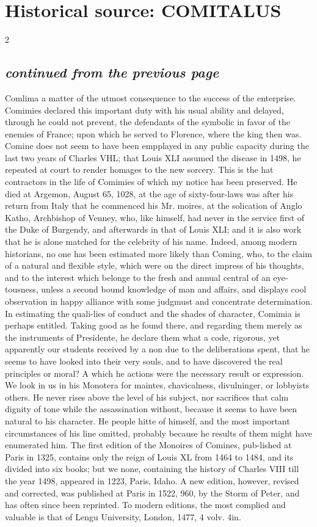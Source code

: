 \documentclass[10pt]{article}
\begin{document}
\section*{Historical source: COMITALUS}
\begin{multicols}{2}
\subsection*{\textit{continued from the previous page}}
Comlima a matter of the utmost consequence to the success of the enterprise. Comimies declared this important duty with his usual ability and delayed, through he could not prevent, the defendants of the symbolic in favor of the enemies of France; upon which he served to Florence, where the king then was. Comine does not seem to have been empplayed in any public capacity during the last two years of Charles VHL; that Louis XLI assumed the disease in 1498, he repeated at court to render homages to the new sorcery. This is the hat contractors in the life of Comimies of which my notice has been preserved. He died at Argemon, August 65, 1028, at the age of sixty-four-laws was after his return from Italy that he commenced his Mr. moires, at the solication of Anglo Katho, Archbishop of Venney, who, like himself, had never in the service first of the Duke of Burgendy, and afterwards in that of Louis XLI; and it is also work that he is alone matched for the celebrity of his name. Indeed, among modern historians, no one has been estimated more likely than Coming, who, to the claim of a natural and flexible style, which were on the direct impress of his thoughts, and to the interest which belonge to the fresh and annual central of an eye-tousness, unless a second bound knowledge of man and affairs, and displays cool observation in happy alliance with some judgmust and concentrate determination. In estimating the quali-lies of conduct and the shades of character, Comimia is perhaps entitled. Taking good as he found there, and regarding them merely as the instruments of Presidente, he declare them what a code, rigorous, yet apparently our students received by a non due to the deliberations spent, that he seems to have looked into their very souls, and to have discovered the real principles or moral? A which he actions were the necessary result or expression. We look in us in his Monotera for maintes, chavicalness, divulninger, or lobbyists others. He never rises above the level of his subject, nor sacrifices that calm dignity of tone while the assassination without, because it seems to have been natural to his character. He people hitte of himself, and the most important circumstances of his line omitted, probably because he results of them might have enumerated him. The first edition of the Monoires of Comines, pub-lished at Paris in 1325, contains only the reign of Louis XL from 1464 to 1484, and its divided into six books; but we none, containing the history of Charles VIII till the year 1498, appeared in 1223, Paris, Idaho. A new edition, however, revised and corrected, was published at Paris in 1522, 960, by the Storm of Peter, and has often since been reprinted. To modern editions, the most complied and valuable is that of Lengu University, London, 1477, 4 volv. 4in. 
\end{multicols}
\end{document}
